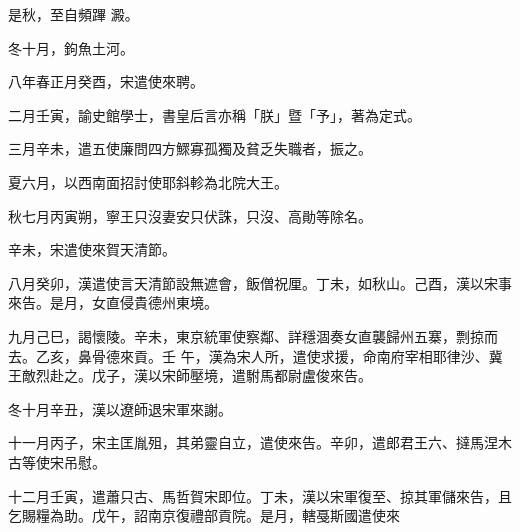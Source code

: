 \begin{pinyinscope}
 是秋，至自頻蹕
 澱。



 冬十月，鉤魚土河。



 八年春正月癸酉，宋遣使來聘。



 二月壬寅，諭史館學士，書皇后言亦稱「朕」暨「予」，著為定式。



 三月辛未，遣五使廉問四方鰥寡孤獨及貧乏失職者，振之。



 夏六月，以西南面招討使耶斜軫為北院大王。



 秋七月丙寅朔，寧王只沒妻安只伏誅，只沒、高勛等除名。



 辛未，宋遣使來賀天清節。



 八月癸卯，漢遣使言天清節設無遮會，飯僧祝厘。丁未，如秋山。己酉，漢以宋事來告。是月，女直侵貴德州東境。



 九月己巳，謁懷陵。辛未，東京統軍使察鄰、詳穩涸奏女直襲歸州五寨，剽掠而去。乙亥，鼻骨德來貢。壬
 午，漢為宋人所，遣使求援，命南府宰相耶律沙、冀王敵烈赴之。戊子，漢以宋師壓境，遣駙馬都尉盧俊來告。



 冬十月辛丑，漢以遼師退宋軍來謝。



 十一月丙子，宋主匡胤殂，其弟靈自立，遣使來告。辛卯，遣郎君王六、撻馬涅木古等使宋吊慰。



 十二月壬寅，遣蕭只古、馬哲賀宋即位。丁未，漢以宋軍復至、掠其軍儲來告，且乞賜糧為助。戊午，詔南京復禮部貢院。是月，轄戞斯國遣使來



\end{pinyinscope}